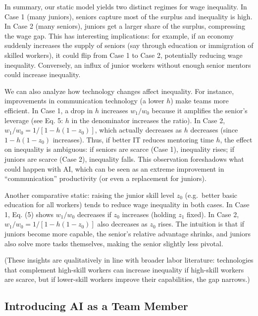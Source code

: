 \documentclass[12pt]{article}
\begin{document}
In summary, our static model yields two distinct regimes for wage
inequality. {In Case 1 (many juniors), seniors capture most of
the surplus and inequality is high}. {In Case 2 (many seniors),
juniors get a larger share of the surplus, compressing the wage gap.}
This has interesting implications: for example, if an economy suddenly
increases the supply of seniors (say through education or immigration of
skilled workers), it could flip from Case 1 to Case 2, potentially
{reducing wage inequality}. Conversely, an influx of junior workers
without enough senior mentors could increase inequality.

We can also analyze how {technology changes} affect inequality.
For instance, improvements in communication technology (a lower \(h\))
make teams more efficient. In Case 1, a drop in \(h\) {increases}
\(w_1/w_0\) because it amplifies the senior's leverage (see Eq. 5: \(h\)
in the denominator increases the ratio). In Case 2,
\(w_1/w_0 = 1/[1-h(1-z_0)]\), which actually {decreases} as \(h\)
decreases (since \(1 - h(1-z_0)\) increases). Thus, if better IT reduces
mentoring time \(h\), the effect on inequality is ambiguous: {if
seniors are scarce (Case 1), inequality rises; if juniors are scarce
(Case 2), inequality falls.} This observation foreshadows what could
happen with AI, which can be seen as an extreme improvement in
``communication'' productivity (or even a replacement for juniors).

Another comparative static: raising the junior skill level \(z_0\)
(e.g.~better basic education for all workers) tends to {reduce
wage inequality} in both cases. In Case 1, Eq. (5) shows \(w_1/w_0\)
decreases if \(z_0\) increases (holding \(z_1\) fixed). In Case 2,
\(w_1/w_0 = 1/[1-h(1-z_0)]\) also decreases as \(z_0\) rises. The
intuition is that if juniors become more capable, the senior's relative
advantage shrinks, and juniors also solve more tasks themselves, making
the senior slightly less pivotal.

{(These insights are qualitatively in line with broader labor
literature: technologies that complement high-skill workers can increase
inequality if high-skill workers are scarce, but if lower-skill workers
improve their capabilities, the gap narrows.)}

\subsection{Introducing AI as a Team Member}\label{introducing-ai-as-a-team-member}
\end{document}

